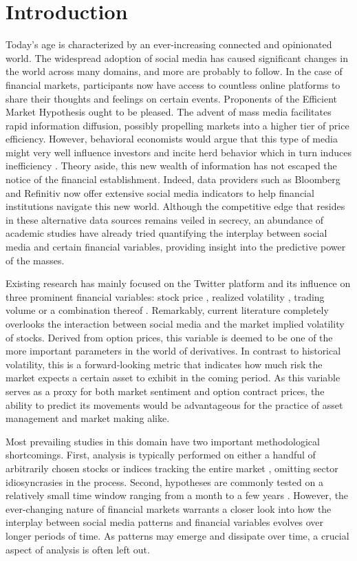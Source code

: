 \documentclass[preprint,1p, times,authoryear]{elsarticle}
\begin{document}
\section{Introduction}
Today's age is characterized by an ever-increasing connected and opinionated world. The widespread adoption of social media has caused significant changes in the world across many domains, and more are probably to follow. In the case of financial markets, participants now have access to countless online platforms to share their thoughts and feelings on certain events. Proponents of the Efficient Market Hypothesis \citep{fama} ought to be pleased. The advent of mass media facilitates rapid information diffusion, possibly propelling markets into a higher tier of price efficiency. However, behavioral economists would argue that this type of media might very well influence investors and incite herd behavior which in turn induces inefficiency \citep[e.g.][]{baker2006,herd2}. Theory aside, this new wealth of information has not escaped the notice of the financial establishment. Indeed, data providers such as Bloomberg and Refinitiv now offer extensive social media indicators to help financial institutions navigate this new world. Although the competitive edge that resides in these alternative data sources remains veiled in secrecy, an abundance of academic studies have already tried quantifying the interplay between social media and certain financial variables, providing insight into the predictive power of the masses. 

Existing research has mainly focused on the Twitter platform and its influence on three prominent financial variables: stock price \citep[e.g.][]{GROKLUMANN2019171, SCHNAUBELT2020103895}, realized volatility \citep[e.g.][]{Karagozoglu}, trading volume \citep[e.g.][]{twitliq} or a combination thereof \citep[e.g.][]{Oliveira2017, twitnoise}. 
Remarkably, current literature completely overlooks the interaction between social media and the market implied volatility of stocks. Derived from option prices, this variable is deemed to be one of the more important parameters in the world of derivatives. In contrast to historical volatility, this is a forward-looking metric that indicates how much risk the market expects a certain asset to exhibit in the coming period. As this variable serves as a proxy for both market sentiment and option contract prices, the ability to predict its movements would be advantageous for the practice of asset management and market making alike.
 
Most prevailing studies in this domain have two important methodological shortcomings. First, analysis is typically performed on either a handful of arbitrarily chosen stocks or indices tracking the entire market \citep[e.g.][]{GROKLUMANN2019171}, omitting sector idiosyncrasies in the process. Second, hypotheses are commonly tested on a relatively small time window ranging from a month \citep[e.g.][]{bollen} to a few years \citep[e.g.][]{SCHNAUBELT2020103895}. However, the ever-changing nature of financial markets warrants a closer look into how the interplay between social media patterns and financial variables evolves over longer periods of time. As patterns may emerge and dissipate over time, a crucial aspect of analysis is often left out. 
\end{document}
